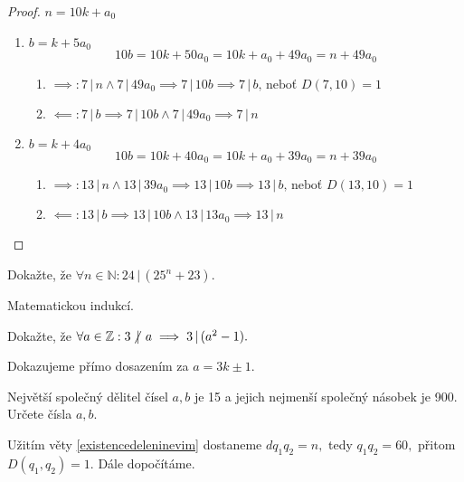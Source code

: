 \begin{proof}
  $n=10k+a_0$
  \begin{enumerate}[$i.$]
    \item $b=k+5a_0$
      \[
        10b=10k+50a_0=10k+a_0+49a_0=n+49a_0
      \]
      \begin{enumerate}
        \item $\implies: 7 \, | \, n \land 7 \, | \, 49a_0 \implies 7 \, | \, 10b \implies 7 \, | \, b \textrm{, neboť } D(7,10)=1$
        \item $\impliedby: 7 \, | \, b \implies 7 \, | \, 10 b \land 7 \, | \, 49 a_0 \implies 7 \, | \, n$
      \end{enumerate}
    \item $b=k+4a_0$
      \[
        10b=10k+40a_0=10k+a_0+39a_0=n+39a_0
      \]
      \begin{enumerate}
        \item $\implies: 13 \, | \, n \land 13 \, | \, 39a_0 \implies 13 \, | \, 10b \implies 13 \, | \, b \textrm{, neboť } D(13,10)=1$
        \item $\impliedby: 13 \, | \, b \implies  13 \, | \, 10 b \land 13 \, | \, 13a_0 \implies 13 \, | \, n$ \qedhere
      \end{enumerate}
  \end{enumerate}
\end{proof}

\begin{priklad}
Dokažte, že  $\forall n \in \mathbb N: 24 \, | \, (25^n+23).$
\end{priklad}

\begin{reseni}
Matematickou indukcí.
\end{reseni}

\begin{priklad}
Dokažte, že $\forall a \in \mathbb Z: 3 \, \centernot | \, a \implies 3 \, | \, (a^2-1).$
\end{priklad}

\begin{reseni}
Dokazujeme přímo dosazením za $a=3k\pm 1.$
\end{reseni}

\begin{priklad}
Největší společný dělitel čísel $a,b$ je 15 a jejich nejmenší společný násobek je 900.
Určete čísla $a,b$.
\end{priklad}

\begin{reseni}
Užitím věty \ref{existencedeleninevim} dostaneme $dq_1q_2=n,$ tedy $q_1q_2=60,$ přitom
$D(q_1,q_2)=1.$ Dále dopočítáme.
\end{reseni}

